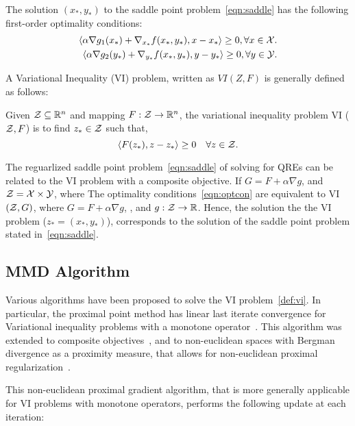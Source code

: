 The solution $(x_{\ast}, y_{\ast})$ to the saddle point problem~\ref{eqn:saddle} has the following first-order optimality conditions:
\begin{equation}
	\label{eqn:optcon} 
	\begin{split}
		\langle \alpha \nabla g_1(x_*) + \nabla_{x_*}
		f(x_*, y_*), x - x_* \rangle \geq 0, \forall x \in \mathcal{X}. \\
		\langle \alpha \nabla g_2(y_*) + \nabla_{y_*} f(x_*, y_*),
		y - y_* \rangle \geq 0, \forall y \in \mathcal{Y}.
	\end{split}
\end{equation}

A Variational Inequality (VI) problem, written as $VI(Z, F)$ is generally defined as follows:
\begin{definition}
	\label{def:vi}
	Given $\mathcal{Z}
		\subseteq \mathbb{R}^n$ and mapping $F: \mathcal{Z} \rightarrow \mathbb{R}^n$, the variational inequality problem VI
	($\mathcal{Z}, F$) is to find $z_{\ast} \in \mathcal{Z}$ such that,
	\[ \langle F(z_{\ast}),
		z - z_{\ast} \rangle \geq 0 \quad \forall z \in \mathcal{Z}.
	\]
\end{definition}

The reguarlized saddle point problem~\ref{eqn:saddle} of solving for QREs can be related to the VI problem 
with a composite objective. If $G = F + \alpha \nabla g$, and $\mathcal{Z} = \mathcal{X} \times \mathcal{Y}$, 
where 
The optimality conditions~\ref{eqn:optcon} are equivalent to VI$(\mathcal{Z}, G)$, where $G = F + \alpha \nabla g$,
, and $g: \mathcal{Z} \rightarrow \mathbb{R}$.
Hence, the solution the the VI problem ($z_{\ast}= (x_{\ast}, y_{\ast})$), corresponds to the
solution of the saddle point problem stated in~\ref{eqn:saddle}.

\subsection{MMD Algorithm}

Various algorithms have been proposed to solve the VI problem~\ref{def:vi}.
In particular, the proximal point method has linear last iterate convergence for Variational 
inequality problems with a monotone operator~\cite{rockafellarMonotone1976}.
This algorithm was extended to composite objectives~\cite{tsenglinear1995}, and to non-euclidean 
spaces with Bergman divergence as a proximity measure, 
that allows for non-euclidean proximal regularization~\cite{tsengApproximation2010}.

This non-euclidean proximal gradient algorithm, that is more generally applicable for VI problems 
with monotone operators, performs the following update at each iteration:

